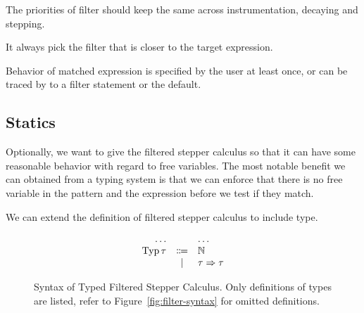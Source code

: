 



\begin{conjecture}
  The priorities of filter should keep the same across instrumentation, decaying and stepping.
\end{conjecture}


\begin{conjecture}
  It always pick the filter that is closer to the target expression.
\end{conjecture}

\begin{conjecture}
  Behavior of matched expression is specified by the user at least once, or can be traced by to a filter statement or the default.
\end{conjecture}

\subsection{Statics}

Optionally, we want to give the filtered stepper calculus so that it can have some reasonable behavior with regard to free variables. The most notable benefit we can obtained from a typing system is that we can enforce that there is no free variable in the pattern and the expression before we test if they match.

We can extend the definition of filtered stepper calculus to include type.
\begin{figure}[h]
  \begin{equation*}
    \begin{array}{rcl}
      \ldots       &         & \ldots \\
      \operatorname{Typ} \tau &\Coloneqq& \mathbb{N} \\
                   &\mid     & \tau \Rightarrow \tau
    \end{array}
  \end{equation*}
  \caption{Syntax of Typed Filtered Stepper Calculus. Only definitions of types are listed, refer to Figure~\ref{fig:filter-syntax} for omitted definitions.}
  \label{fig:typed-filter-syntax}
\end{figure}

